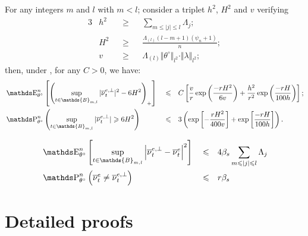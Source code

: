 \begin{pr}\label{PRD.5.5}
For any integers $m$ and $l$ with $m < l$; consider a triplet $h^{2}$, $H^{2}$ and $v$ verifying
\begin{alignat*}{3}
& h^{2} && \geq &&\sum\limits_{m \leq \vert j \vert \leq l} \Lambda_{j};\\
& H^{2} && \geq && \frac{\Lambda_{(l)}(l-m+1)( \psi_{n} + 1)}{n};\\
& v && \geq &&\Lambda_{(l)} \Vert \theta^{\circ} \Vert_{l^{2}} \cdot \Vert \lambda \Vert_{l^{2}};
\end{alignat*}
then, under , for any $C > 0$, we have:
\begin{alignat}{3}
& \E_{\theta^{\circ}}^{n}\left[\left(\sup\limits_{t \in \mathds{B}_{m, l}}\vert \overline{\nu}^{e, \perp}_{t} \vert^{2} - 6 H^{2}\right)_{+}\right] && \leq && C \left[\frac{v}{r} \exp\left(\frac{-r H^{2}}{6 v}\right) + \frac{h^{2}}{r^{2}} \exp\left(\frac{- r H}{100 h}\right)\right];\label{EQD.28}\\
& \P_{\theta^{\circ}}^{n}\left(\sup\limits_{t \in \mathds{B}_{m, l}} \vert \overline{\nu}^{e, \perp}_{t} \vert \geq 6 H^{2}\right) && \leq && 3 \left(\exp\left[- \frac{r H^{2}}{400 v}\right] + \exp\left[ \frac{-r H}{100 h}\right]\right)\label{EQD.29}.
\end{alignat}
\end{pr}

\begin{pr}\label{PRD.5.6}
\begin{alignat}{3}
& \E_{\theta^{\circ}}^{n}\left[\sup\limits_{t \in \mathds{B}_{m, l}} \left\vert \overline{\nu}^{e, \perp}_{t} - \overline{\nu}^{e}_{t} \right\vert^{2} \right] && \leq && 4 \beta_{s} \sum\limits_{m \leq \vert j \vert \leq l} \Lambda_{j}\label{EQD.30}\\
& \P_{\theta^{\circ}}^{n}\left(\overline{\nu}_{t}^{e} \neq \overline{\nu}_{t}^{e, \perp}\right) && \leq && r\beta_{s}\label{EQD.31}
\end{alignat}
\end{pr}

\section{Detailed proofs}

